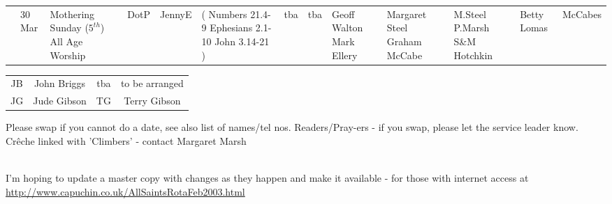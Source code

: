 \documentclass[10pt,a4paper]{article}
\begin{document}
\begin{landscape}
\begin{center}
{\begin{tabular}{|l|p{2cm}|p{1.4cm}|p{1.0cm}|p{0.8cm}|p{3.4cm}|p{2cm}|p{1.5cm}|p{2cm}|p{2cm}|p{1.9cm}
|p{2cm}|p{1.8cm}|}
&   & &  \\
\hline
& 30 Mar & Mothering Sunday ($5^{th}$)
\linebreak All Age Worship & DotP & JennyE & 
{\footnotesize (
Numbers 21.4-9 
Ephesians 2.1-10 
John 3.14-21 
)}
    & tba & tba
 &  Geoff Walton Mark Ellery & 
Margaret Steel Graham McCabe &
M.Steel P.Marsh \linebreak S\&M Hotchkin
&  Betty Lomas &  McCabes \\
\hline
\end{tabular}
}

\begin{tabular}{|c|c|c|c|}\hline
JB & John Briggs &  tba & to be arranged  \\ %
JG  & Jude Gibson & TG & Terry Gibson 
  \\ \hline
\end{tabular}
\end{center}
\vspace{1em}
Please swap if you cannot do a date, see also list of names/tel nos.
Readers/Pray-ers - if you swap, please let the service leader know.\\
Cr\^{e}che linked with 'Climbers' - contact Margaret Marsh
{\\ \footnotesize I'm hoping to update a master copy with changes as they
happen and make it available - for those with internet access at
\url{http://www.capuchin.co.uk/AllSaintsRotaFeb2003.html} 

}
\end{landscape}
\end{document}
